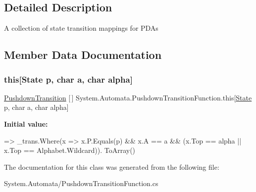 \subsection{Detailed Description}
A collection of state transition mappings for P\+D\+As 



\subsection{Member Data Documentation}
\mbox{\label{class_system_1_1_automata_1_1_pushdown_transition_function_ae1c7ef36c2a602d2fdce4ea41573543c}} 
\subsubsection{\texorpdfstring{this[State p, char a, char alpha]}{this[State p, char a, char alpha]}}
{\footnotesize\ttfamily \mbox{\hyperlink{class_system_1_1_automata_1_1_pushdown_transition}{Pushdown\+Transition}} \mbox{[}$\,$\mbox{]} System.\+Automata.\+Pushdown\+Transition\+Function.\+this\mbox{[}\mbox{\hyperlink{class_system_1_1_automata_1_1_state}{State}} p, char a, char alpha\mbox{]}}

{\bfseries Initial value\+:}
\begin{DoxyCode}
=>
            \_trans.Where(x => x.P.Equals(p) && x.A == a && (x.Top == alpha || x.Top == Alphabet.Wildcard)).
      ToArray()
\end{DoxyCode}


The documentation for this class was generated from the following file\+:\begin{DoxyCompactItemize}
\item 
System.\+Automata/Pushdown\+Transition\+Function.\+cs\end{DoxyCompactItemize}
